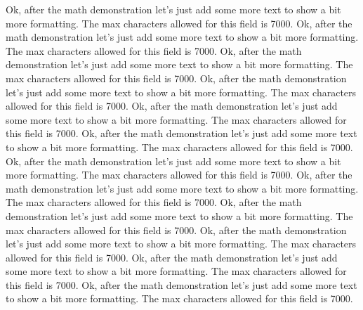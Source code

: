 \documentclass[12pt]{article}
\begin{document}
Ok, after the math demonstration let's just add some more text to show a bit more formatting. The max characters allowed for this field is 7000. Ok, after the math demonstration let's just add some more text to show a bit more formatting. The max characters allowed for this field is 7000. Ok, after the math demonstration let's just add some more text to show a bit more formatting. The max characters allowed for this field is 7000. Ok, after the math demonstration let's just add some more text to show a bit more formatting. The max characters allowed for this field is 7000. Ok, after the math demonstration let's just add some more text to show a bit more formatting. The max characters allowed for this field is 7000. Ok, after the math demonstration let's just add some more text to show a bit more formatting. The max characters allowed for this field is 7000. Ok, after the math demonstration let's just add some more text to show a bit more formatting. The max characters allowed for this field is 7000. Ok, after the math demonstration let's just add some more text to show a bit more formatting. The max characters allowed for this field is 7000. Ok, after the math demonstration let's just add some more text to show a bit more formatting. The max characters allowed for this field is 7000. Ok, after the math demonstration let's just add some more text to show a bit more formatting. The max characters allowed for this field is 7000. Ok, after the math demonstration let's just add some more text to show a bit more formatting. The max characters allowed for this field is 7000. Ok, after the math demonstration let's just add some more text to show a bit more formatting. The max characters allowed for this field is 7000. 
\end{document}
